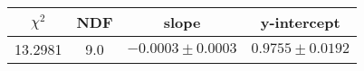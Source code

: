 \begin{tabular}{|c|c|c|c|}

\hline
$\chi^{2}$ & NDF & slope & y-intercept  \\
\hline
13.2981 & 9.0 & $-0.0003\pm0.0003$ & $0.9755\pm0.0192$ \\
\hline

\end{tabular}